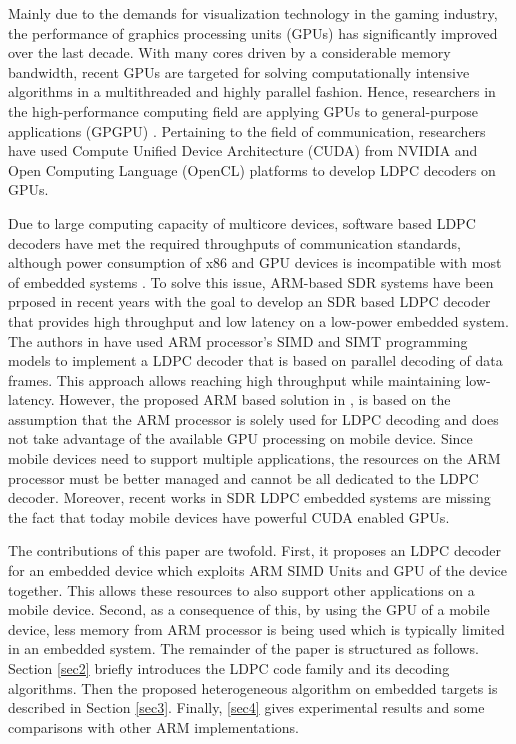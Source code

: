 \documentclass[conference]{IEEEtran}
\begin{document}
Mainly due to the demands for visualization technology in the gaming industry, the performance of graphics processing units (GPUs) has significantly improved over the last decade. With many cores driven by a considerable memory bandwidth, recent GPUs are targeted for solving computationally intensive algorithms in a multithreaded and highly parallel fashion. Hence, researchers in the high-performance computing field are applying GPUs to general-purpose applications (GPGPU) \cite{art_gpu_0,art_cuda_openmp, art_memory_coalesced, art_ldpc_OpenCl, art_optimize_0, art_layered1}. Pertaining to the field of communication, researchers have used Compute Unified Device Architecture (CUDA) from NVIDIA \cite{website_cuda} and Open Computing Language (OpenCL) platforms to develop LDPC decoders on GPUs.

Due to large computing capacity of multicore devices, software based LDPC decoders have met the required throughputs of communication standards, although power consumption of x86 and GPU devices is incompatible with most of embedded systems \cite{art_neon}. To solve this issue, ARM-based SDR systems have been prposed in recent years \cite{art_neon, art_ldpc_cpu0, art_ldpc_OpenCl_1} with the goal to develop an SDR based LDPC decoder that provides high throughput and low latency on a low-power embedded system. The authors in \cite{art_neon} have used ARM processor's SIMD and SIMT programming models to implement a LDPC decoder that is based on parallel decoding of data frames. This approach allows reaching high throughput while maintaining low-latency. However, the proposed ARM based solution in \cite{art_neon}, is based on the assumption that the ARM processor is solely used for LDPC decoding and does not take advantage of the available GPU processing on mobile device. Since mobile devices need to support multiple applications, the resources on the ARM processor must be better managed and cannot be all dedicated to the LDPC decoder. Moreover, recent works in SDR LDPC embedded systems are missing the fact that today mobile devices have powerful CUDA enabled GPUs.

The contributions of this paper are twofold. First, it proposes an LDPC decoder for an embedded device which exploits ARM SIMD Units and GPU of the device together. This allows these resources to also support other applications on a mobile device. Second, as a consequence of this, by using the GPU of a mobile device, less memory from ARM processor is being used which is typically limited in an embedded system. The remainder of the paper is structured as follows. Section \ref{sec2} briefly  introduces the LDPC code family and its decoding algorithms. Then the proposed heterogeneous algorithm on embedded targets is described in Section \ref{sec3}. Finally, \ref{sec4} gives experimental results and some comparisons with other ARM implementations.
\end{document}
